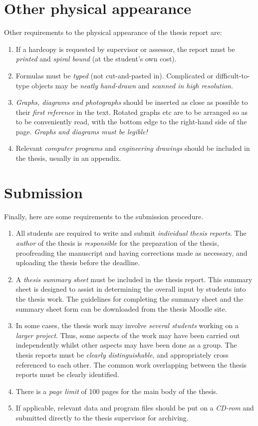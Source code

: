 \section{Other physical appearance}
Other requirements to the physical appearance of the thesis report are:
\begin{enumerate}
\item If a hardcopy is requested by supervisor or assessor, the report must be
\emph{printed} and \emph{spiral bound} (at the student's own cost).
\item Formulas must be \emph{typed} (not cut-and-pasted in).  Complicated or
difficult-to-type objects may be \emph{neatly
hand-drawn} and \emph{scanned in high resolution}.
\item \emph{Graphs, diagrams and photographs} should be inserted as close as
possible to their \emph{first reference} in the text. Rotated
graphs etc are to be arranged so as to be conveniently read, with the
bottom edge to the right-hand side of the page.
\emph{Graphs and diagrams must be legible!}
\item Relevant \emph{computer programs} and \emph{engineering drawings} should
be included in the thesis, usually in an appendix.
\end{enumerate}

\section{Submission}

Finally, here are some requirements to the submission procedure. 

\begin{enumerate}
\item All students are required to write and submit \emph{individual thesis
reports}.
The \emph{author} of the thesis is \emph{responsible} for the preparation of
the thesis, proofreading the
manuscript and having corrections made as necessary, and uploading the
thesis before the deadline.
\item A \emph{thesis summary sheet} must be included in the thesis report.
This summary sheet is designed to assist
in determining the overall input by students into the thesis work.
The guidelines for completing
the summary sheet and the summary sheet form can be downloaded from the
thesis Moodle site.
\item In some cases, the thesis work may involve \emph{several students}
working on a \emph{larger project}.
Thus, some aspects of the work may have been carried out
independently whilst other aspects may have been done as a group.  The
thesis reports must be \emph{clearly distinguishable}, and appropriately cross
referenced to each other.  The common work overlapping between the thesis
reports must be clearly identified.
\item There is a \emph{page limit} of 100 pages for the main body of the thesis.
\item If applicable, relevant data and program files should be put on a
\emph{CD-rom} and submitted directly to the thesis supervisor for archiving.
\end{enumerate}

